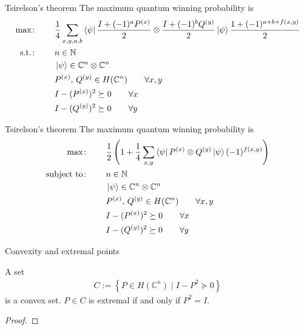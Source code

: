\documentclass{beamer}
\begin{document}
\begin{frame}{Tsirelson's theorem}
\small
The maximum quantum winning probability is
\begin{align*}
\max\colon\qquad& \frac14\sum_{x,y,a,b} \bra{\psi}\frac{I+(-1)^aP^{(x)}}2\otimes\frac{I+(-1)^b Q^{(y)}}2\ket{\psi}\frac{1+(-1)^{a+b+f(x,y)}}2\\
\text{s.t.}\colon\qquad&
n\in\mathbb{N}\\
&\ket{\psi} \in \mathbb{C}^n\otimes\mathbb{C}^n\\
&P^{(x)},\, Q^{(y)} \in H(\mathbb{C}^n)\qquad  \forall x,y\\
&I-(P^{(x)})^2\succeq 0\qquad \forall x\\
&I-(Q^{(y)})^2\succeq 0\qquad \forall y\\
\end{align*}
\end{frame}

\begin{frame}{Tsirelson's theorem}
\small
The maximum quantum winning probability is
\begin{align*}
\max\colon\qquad& \frac12\left(1 + \frac14\sum_{x,y} \bra{\psi}P^{(x)}\otimes Q^{(y)}\ket{\psi}(-1)^{f(x,y)}\right)\\
\text{subject to}\colon\qquad&
n\in\mathbb{N}\\
&\ket{\psi} \in \mathbb{C}^n\otimes\mathbb{C}^n\\
&P^{(x)},\, Q^{(y)} \in H(\mathbb{C}^n)\qquad  \forall x,y\\
&I-(P^{(x)})^2\succeq 0\qquad \forall x\\
&I-(Q^{(y)})^2\succeq 0\qquad \forall y\\
\end{align*}
\end{frame}

\begin{frame}{Convexity and extremal points}
\begin{lemma}
A set
\begin{align*}
C:=\left\{P\in H(\mathbb{C}^n)\mid I-P^2 \succeq 0\right\}
\end{align*}
is a convex set. $P\in C$ is extremal if and only if $P^2=I$.
\end{lemma}
\begin{proof}
\end{proof}
\end{frame}
\end{document}
